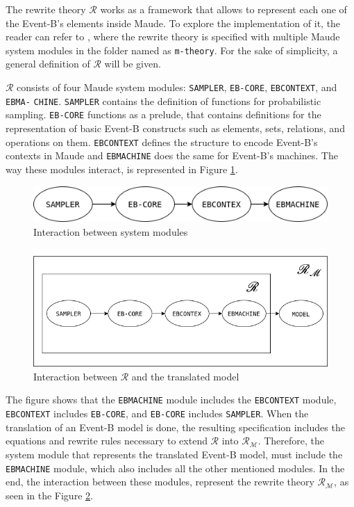 The rewrite theory $\mathscr{R}$ works as a framework that allows to represent each one of the Event-B's elements inside Maude. To explore the implementation of it, the reader can refer to \cite{tool.website}, where the rewrite theory is specified with multiple Maude system modules in the folder named as \texttt{m-theory}. For the sake of simplicity, a general definition of $\mathscr{R}$ will be given.

$\mathscr{R}$ consists of four Maude system modules: \texttt{SAMPLER}, \texttt{EB-CORE}, \texttt{EBCONTEXT}, and \texttt{EBMA-} \texttt{CHINE}. \texttt{SAMPLER} contains the definition of functions for probabilistic sampling. \texttt{EB-CORE} functions as a prelude, that contains definitions for the representation of basic Event-B constructs such as elements, sets, relations, and operations on them. \texttt{EBCONTEXT} defines the structure to encode Event-B's contexts in Maude and \texttt{EBMACHINE} does the same for Event-B's machines. The way these modules interact, is represented in Figure \ref{fig:E2M1}. 

\begin{figure}[H]
    \centering
    \includegraphics[scale = 0.5]{images/E2M1.png}
    \caption{Interaction between system modules}
    \label{fig:E2M1}
\end{figure}

\begin{figure}[H]
    \centering
    \includegraphics[scale = 0.5]{images/E2M2.png}
    \caption{Interaction between $\mathscr{R}$ and the translated model}
    \label{fig:E2M2}
\end{figure}

The figure shows that the \texttt{EBMACHINE} module includes the \texttt{EBCONTEXT} module, \texttt{EBCONTEXT} includes \texttt{EB-CORE}, and \texttt{EB-CORE} includes  \texttt{SAMPLER}. When the translation of an Event-B model is done, the resulting specification includes the equations and rewrite rules necessary to extend $\mathscr{R}$ into $\mathscr{R}_\mathscr{M}$. Therefore, the system module that represents the translated Event-B model, must include the \texttt{EBMACHINE} module, which also includes all the other mentioned modules. In the end, the interaction between these modules, represent the rewrite theory $\mathscr{R}_\mathscr{M}$, as seen in the Figure \ref{fig:E2M2}.

